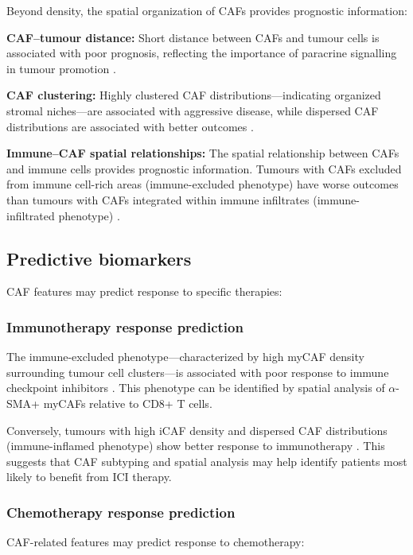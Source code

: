 Beyond density, the spatial organization of CAFs provides prognostic information:

\textbf{CAF--tumour distance:} Short distance between CAFs and tumour cells is associated with poor prognosis, reflecting the importance of paracrine signalling in tumour promotion \citep{erve2024}.

\textbf{CAF clustering:} Highly clustered CAF distributions---indicating organized stromal niches---are associated with aggressive disease, while dispersed CAF distributions are associated with better outcomes \citep{erve2024}.

\textbf{Immune--CAF spatial relationships:} The spatial relationship between CAFs and immune cells provides prognostic information. Tumours with CAFs excluded from immune cell-rich areas (immune-excluded phenotype) have worse outcomes than tumours with CAFs integrated within immune infiltrates (immune-infiltrated phenotype) \citep{chhabra2023}.

\subsection{Predictive biomarkers}

CAF features may predict response to specific therapies:

\subsubsection{Immunotherapy response prediction}

The immune-excluded phenotype---characterized by high myCAF density surrounding tumour cell clusters---is associated with poor response to immune checkpoint inhibitors \citep{chhabra2023}. This phenotype can be identified by spatial analysis of $\alpha$-SMA+ myCAFs relative to CD8+ T cells.

Conversely, tumours with high iCAF density and dispersed CAF distributions (immune-inflamed phenotype) show better response to immunotherapy \citep{chhabra2023}. This suggests that CAF subtyping and spatial analysis may help identify patients most likely to benefit from ICI therapy.

\subsubsection{Chemotherapy response prediction}

CAF-related features may predict response to chemotherapy:

